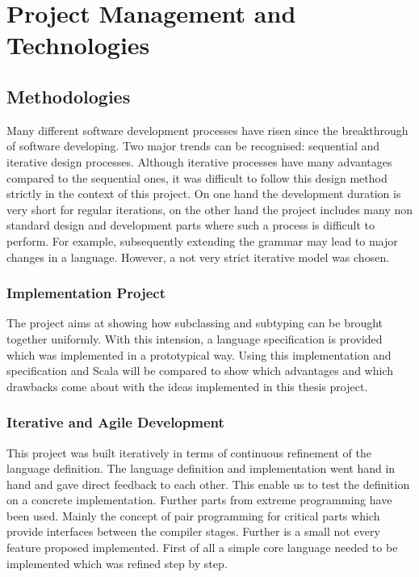 \chapter{Project Management and Technologies}
\label{ctr:projectManagement}
\section{Methodologies}
Many different software development processes have risen since the
breakthrough of software developing. Two major trends can be recognised:
sequential and iterative design processes. Although iterative processes
have many advantages compared to the sequential ones, it was difficult to follow
this design method strictly in the context of this project. On one
hand the development duration is very short for regular iterations, on the
other hand the project includes many non standard design and development
parts where such a process is difficult to perform. For example,
subsequently extending the grammar may lead to major changes in a language. However,
a not very strict iterative model was chosen.

\subsection{Implementation Project}
The project aims at showing how subclassing and subtyping can be brought
together uniformly. With this intension, a language specification is provided which
was implemented in a prototypical way. Using this implementation and
specification \ooplss and Scala will be compared to
show which advantages and which drawbacks come about with the ideas implemented
in this thesis project.

\subsection{Iterative and Agile Development}
This project was built iteratively in terms of continuous refinement
of the language definition. The language definition and implementation
went hand in hand and gave direct feedback to each other. This enable us
to test the definition on a concrete implementation. Further parts from
extreme programming have been used. Mainly the concept of pair programming
for critical parts which provide interfaces between the compiler
stages. Further is a small not every feature proposed implemented.
First of all a simple core language needed to be implemented which was
refined step by step.


